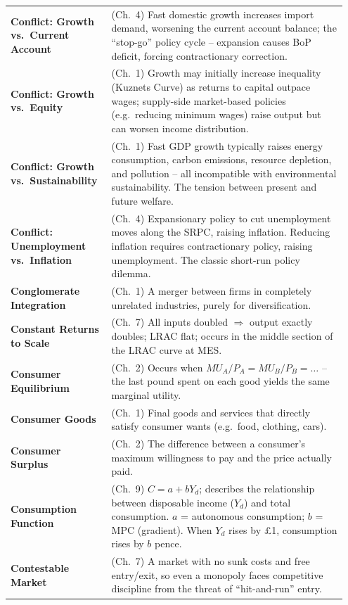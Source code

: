 \documentclass[11pt, a4paper, twoside]{book}
\begin{document}
\begin{longtable}{@{}>{\RaggedRight\arraybackslash}p{0.28\linewidth}>{\RaggedRight\arraybackslash}p{0.67\linewidth}@{}}
\textbf{Conflict: Growth vs.\ Current Account} & (Ch.~4) Fast domestic growth increases import demand, worsening the current account balance; the ``stop-go'' policy cycle -- expansion causes BoP deficit, forcing contractionary correction. \\
\textbf{Conflict: Growth vs.\ Equity} & (Ch.~1) Growth may initially increase inequality (Kuznets Curve) as returns to capital outpace wages; supply-side market-based policies (e.g.\ reducing minimum wages) raise output but can worsen income distribution. \\
\textbf{Conflict: Growth vs.\ Sustainability} & (Ch.~1) Fast GDP growth typically raises energy consumption, carbon emissions, resource depletion, and pollution -- all incompatible with environmental sustainability. The tension between present and future welfare. \\
\textbf{Conflict: Unemployment vs.\ Inflation} & (Ch.~4) Expansionary policy to cut unemployment moves along the SRPC, raising inflation. Reducing inflation requires contractionary policy, raising unemployment. The classic short-run policy dilemma. \\
\textbf{Conglomerate Integration} & (Ch.~1) A merger between firms in completely unrelated industries, purely for diversification. \\
\textbf{Constant Returns to Scale} & (Ch.~7) All inputs doubled $\Rightarrow$ output exactly doubles; LRAC flat; occurs in the middle section of the LRAC curve at MES. \\
\textbf{Consumer Equilibrium} & (Ch.~2) Occurs when $MU_A/P_A = MU_B/P_B = \ldots$ -- the last pound spent on each good yields the same marginal utility. \\
\textbf{Consumer Goods} & (Ch.~1) Final goods and services that directly satisfy consumer wants (e.g.\ food, clothing, cars). \\
\textbf{Consumer Surplus} & (Ch.~2) The difference between a consumer's maximum willingness to pay and the price actually paid. \\
\textbf{Consumption Function} & (Ch.~9) $C = a + bY_d$; describes the relationship between disposable income ($Y_d$) and total consumption. $a$ = autonomous consumption; $b$ = MPC (gradient). When $Y_d$ rises by \pounds1, consumption rises by $b$ pence. \\
\textbf{Contestable Market} & (Ch.~7) A market with no sunk costs and free entry/exit, so even a monopoly faces competitive discipline from the threat of ``hit-and-run'' entry. \\

\end{longtable}
\end{document}

